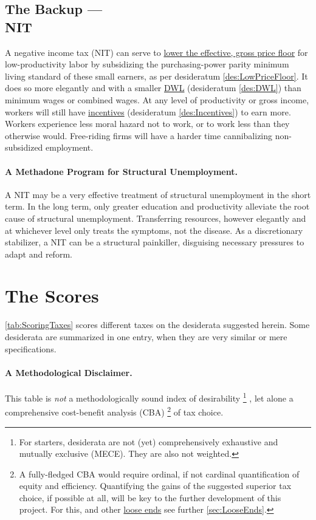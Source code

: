 \subsection[Negative Income Tax]{The Backup ---\\NIT} \label{sec:ScoreNIT} A negative income tax (NIT) can serve to \hyperref[des:LowPriceFloor]{lower the effective, gross price floor} for low-productivity labor by subsidizing the purchasing-power parity minimum living standard of these small earners, as per desideratum \ref{des:LowPriceFloor}.
It does so more elegantly and with a smaller \hyperref[des:DWL]{DWL} (desideratum \ref{des:DWL}) than minimum wages or combined wages.
At any level of productivity or gross income, workers will still have \hyperref[des:Incentives]{incentives} (desideratum \ref{des:Incentives}) to earn more.
Workers experience less moral hazard not to work, or to work less than they otherwise would.
Free-riding firms will have a harder time cannibalizing non-subsidized employment.

\paragraph{A Methadone Program for Structural Unemployment.} A NIT may be a very effective treatment of structural unemployment in the short term.
In the long term, only greater education and productivity alleviate the root cause of structural unemployment.
Transferring resources, however elegantly and at whichever level only treats the symptoms, not the disease.
As a discretionary stabilizer, a NIT can be a structural painkiller, disguising necessary pressures to adapt and reform.
\clearpage

\section{The Scores} \label{sec:Scores}

\autoref{tab:ScoringTaxes} scores different taxes on the desiderata suggested herein.
Some desiderata are summarized in one entry, when they are very similar or mere specifications.

\paragraph{A Methodological Disclaimer.} This table is \emph{not} a methodologically sound index of desirability
\footnote{
	For starters, desiderata are not (yet) comprehensively exhaustive and mutually exclusive (MECE).
	They are also not weighted.
}
, let alone a comprehensive cost-benefit analysis (CBA)
\footnote{
	A fully-fledged CBA would require ordinal, if not cardinal quantification of equity and efficiency.
	Quantifying the gains of the suggested superior tax choice, if possible at all, will be key to the further development of this project.
	For this, and other \hyperref[sec:LooseEnds]{loose ends} see further \autoref{sec:LooseEnds}.
}
of tax choice.


